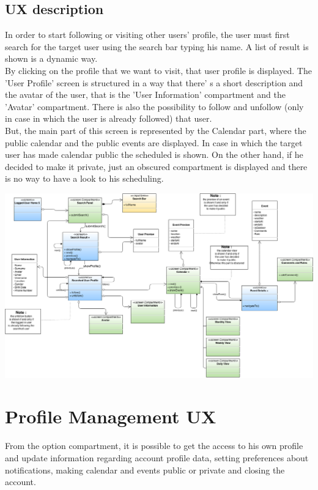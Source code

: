 \documentclass[12pt]{book}
\begin{document}
\subsection{UX description}
In order to start following or visiting other users' profile, the user must first search for the target user using the search bar typing his name. A list of result is shown is a dynamic way. \\
By clicking on the profile that we want to visit, that user profile is displayed. 
The 'User Profile' screen is structured in a way that there' s a short description and the avatar of the user, that is the 'User Information' compartment and the 'Avatar' compartment. 
There is also the possibility to follow and unfollow (only in case in which the user is already followed) that user. \\
But, the main part of this screen is represented by the Calendar part, where the public calendar and the public events are displayed. In case in which the target user has made calendar public the scheduled is shown. 
On the other hand, if he decided to make it private, just an obscured compartment is displayed and there is no way to have a look to his scheduling.  
\begin{landscape}
\begin{center}
\includegraphics[scale=0.5]{social_UX}\\
\end{center}
\end{landscape}

\section{Profile Management UX}
From the option compartment, it is possible to get the access to his own profile and update information regarding account profile data, setting preferences about notifications, making calendar and events public or private and closing the account. 
\end{document}
